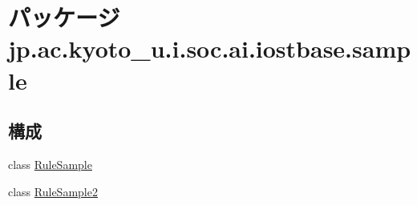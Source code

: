 \hypertarget{namespacejp_1_1ac_1_1kyoto__u_1_1i_1_1soc_1_1ai_1_1iostbase_1_1sample}{\section{パッケージ jp.\-ac.\-kyoto\-\_\-u.\-i.\-soc.\-ai.\-iostbase.\-sample}
\label{namespacejp_1_1ac_1_1kyoto__u_1_1i_1_1soc_1_1ai_1_1iostbase_1_1sample}
}
\subsection*{構成}
\begin{DoxyCompactItemize}
\item 
class \hyperlink{classjp_1_1ac_1_1kyoto__u_1_1i_1_1soc_1_1ai_1_1iostbase_1_1sample_1_1_rule_sample}{Rule\-Sample}
\item 
class \hyperlink{classjp_1_1ac_1_1kyoto__u_1_1i_1_1soc_1_1ai_1_1iostbase_1_1sample_1_1_rule_sample2}{Rule\-Sample2}
\end{DoxyCompactItemize}
